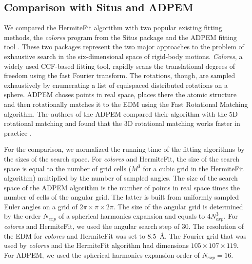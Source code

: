 \subsection{Comparison with Situs and ADP\underline{\hspace*{0.2cm}}EM}
We compared the HermiteFit algorithm with two popular existing fitting methods, the {\em colores} program
from the Situs package \cite{Chacon2002} and the ADP\underline{\hspace*{0.2cm}}EM fitting tool  \cite{garzon2007adp_em}. 
These two packages represent the two major approaches to the problem of exhaustive search in the six-dimensional space of rigid-body motions.
{\em Colores}, a widely used 
CCF-based fitting tool, rapidly scans the translational degrees of freedom using the fast Fourier transform.  The rotations, though, are sampled exhaustively 
by enumerating a list of equispaced distributed rotations on a sphere.
ADP\underline{\hspace*{0.2cm}}EM 
choses points in real space, places there the atomic structure and then rotationally matches it to the EDM using the Fast Rotational Matching algorithm.
The authors of the ADP\underline{\hspace*{0.2cm}}EM compared their algorithm with the 5D rotational matching and found that the 3D rotational matching works faster 
in practice \cite{garzon2007adp_em}. 

For the comparison, we normalized the running time of the fitting algorithms by the sizes of the search space. 
For {\em colores} and HermiteFit, the size of the search space is equal to the number of grid cells ($M^3$ for a cubic grid in the HermiteFit algorithm) multiplied by the number of sampled angles.
The size of the search space of the ADP\underline{\hspace*{0.2cm}}EM algorithm is the number of points in real space times the number of cells of the angular grid. The latter is
built from uniformly sampled Euler angles on a grid of $2\pi\times\pi\times 2\pi$. The size of the angular grid is determined by the order $N_{exp}$ of 
a spherical harmonics expansion and equals to $4N_{exp}^3$.
For {\em colores} and HermiteFit, we used the angular search step of 30\textdegree. The resolution of the EDM 
for {\em colores} and HermiteFit was set to 8.5~\AA. The Fourier grid that was used by {\em colores} and the HermiteFit algorithm had dimensions $105 \times 107 \times 119$.
For ADP\underline{\hspace*{0.2cm}}EM, we used the spherical harmonics expansion order of $N_{exp}=16$.


